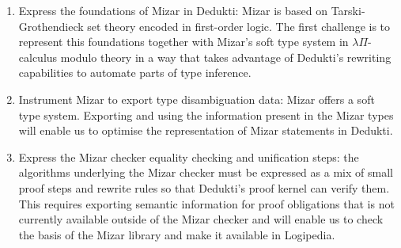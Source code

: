 
\begin{enumerate}
\item Express the foundations of Mizar in Dedukti: Mizar is based on
  Tarski-Grothendieck set theory encoded in first-order logic. The first challenge
  is to represent this foundations together with Mizar's soft type system
  in $\lambda\Pi$-calculus modulo theory in a way that takes advantage of Dedukti's
  rewriting capabilities to automate parts of type inference.
\item Instrument Mizar to export type disambiguation data: Mizar offers a soft
  type system. Exporting and using the information present in the Mizar types
  will enable us to optimise the representation of Mizar statements in Dedukti.
\item Express the Mizar checker equality checking and unification steps: the
  algorithms underlying the Mizar checker must be expressed as a mix of small
  proof steps and rewrite rules so that Dedukti's proof kernel can verify them.
  This requires exporting semantic information for proof obligations that is not
  currently available outside of the Mizar checker and will enable us to check
  the basis of the Mizar library and make it available in Logipedia.
\end{enumerate}




